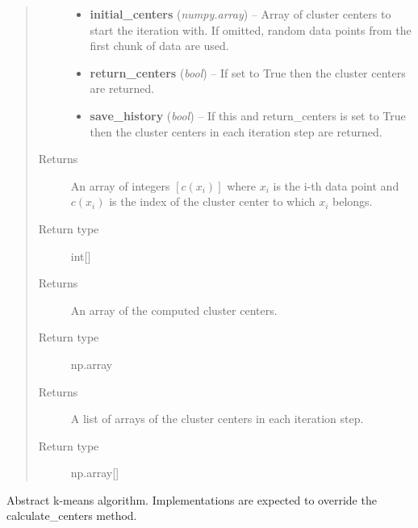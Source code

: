 \documentclass[letterpaper,10pt,english]{sphinxmanual}
\begin{document}
\begin{fulllineitems}
\begin{fulllineitems}
\begin{quote}
\begin{description}
\begin{itemize}
\item {} 
\textbf{initial\_centers} (\emph{numpy.array}) -- Array of cluster centers to start the iteration with. If omitted, random data points
from the first chunk of data are used.

\item {} 
\textbf{return\_centers} (\emph{bool}) -- If set to True then the cluster centers are returned.

\item {} 
\textbf{save\_history} (\emph{bool}) -- If this and return\_centers is set to True then the cluster centers in each iteration step
are returned.

\end{itemize}

\item[{Returns}] \leavevmode
An array of integers \([c(x_i)]\) where \(x_i\) is the i-th data point and
\(c(x_i)\) is the index of the cluster center to which \(x_i\) belongs.

\item[{Return type}] \leavevmode
int{[}{]}

\item[{Returns}] \leavevmode
An array of the computed cluster centers.

\item[{Return type}] \leavevmode
np.array

\item[{Returns}] \leavevmode
A list of arrays of the cluster centers in each iteration step.

\item[{Return type}] \leavevmode
np.array{[}{]}

\end{description}\end{quote}

\end{fulllineitems}


\end{fulllineitems}


\begin{fulllineitems}
\label{kmeans:kmeans.Kmeans}
Abstract k-means algorithm. Implementations are expected to override the calculate\_centers method.

\end{fulllineitems}
\end{document}
